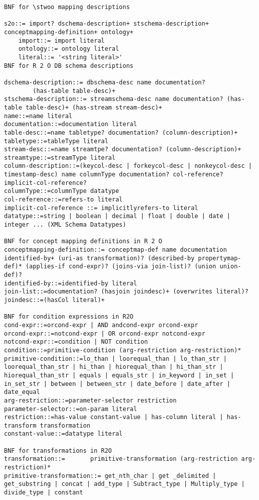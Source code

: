 \documentclass[preprint,5p,twocolumn,12pt]{elsarticle}
\newcommand{\subscript}[1]{\ensuremath{_{\textrm{#1}}}}
\newcommand{\stwoo}{\textsc{s\subscript{2}o}\xspace}
\begin{document}
\begin{lstlisting}[style=SNEEqlStyle,language=R2O,label=list:schema,caption=Relational schema of the stream data source.]
BNF for \stwoo mapping descriptions

s2o::= import? dschema-description+ stschema-description+ conceptmapping-definition+ ontology+
	import::= import literal
	ontology::= ontology literal
	literal::= '<string literal>'
BNF for R 2 O DB schema descriptions

dschema-description::= dbschema-desc name documentation?
		(has-table table-desc)+ 
stschema-description::= streamschema-desc name documentation? (has-table table-desc)+ (has-stream stream-desc)+
name::=name literal
documentation::=documentation literal
table-desc::=name tabletype? documentation? (column-description)+
tabletype::=tableType literal
stream-desc::=name streamtpe? documentation? (column-description)+
streamtype::=streamType literal
column-description::=(keycol-desc | forkeycol-desc | nonkeycol-desc | timestamp-desc) name columnType documentation? col-reference? implicit-col-reference?
columnType::=columnType datatype
col-reference::=refers-to literal
implicit-col-reference ::= implicitlyrefers-to literal
datatype::=string | boolean | decimal | float | double | date | integer ... (XML Schema Datatypes)

BNF for concept mapping definitions in R 2 O
conceptmapping-definition::= conceptmap-def name documentation identified-by+ (uri-as transformation)? (described-by propertymap-def)* (applies-if cond-expr)? (joins-via join-list)? (union union-def)?
identified-by::=identified-by literal
join-list::=documentation? (hasjoin joindesc)+ (overwrites literal)?
joindesc::=(hasCol literal)+

BNF for condition expressions in R2O
cond-expr::=orcond-expr | AND andcond-expr orcond-expr
orcond-expr::=notcond-expr | OR orcond-expr notcond-expr
notcond-expr::=condition | NOT condition
condition::=primitive-condition (arg-restriction arg-restriction)*
primitive-condition::=lo_than | loorequal_than | lo_than_str | loorequal_than_str | hi_than | hiorequal_than | hi_than_str | hiorequal_than_str | equals | equals_str | in_keyword | in_set | in_set_str | between | between_str | date_before | date_after | date_equal
arg-restriction::=parameter-selector restriction
parameter-selector::=on-param literal
restriction::=has-value constant-value | has-column literal | has-transform transformation 
constant-value::=datatype literal

BNF for transformations in R2O
transformation::= 		primitive-transformation (arg-restriction arg-restriction)*
primitive-transformation::= get_nth_char | get _delimited | get_substring | concat | add_type | Subtract_type | Multiply_type | divide_type | constant


\end{lstlisting}
\end{document}

